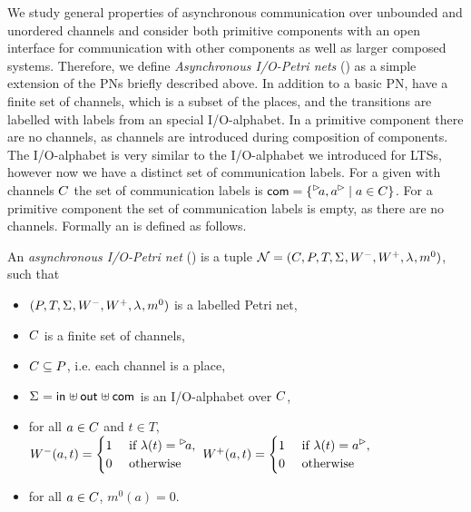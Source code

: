 We study general properties of asynchronous communication over unbounded and unordered channels and consider both primitive components with an open interface for communication with other components as well as larger composed systems. Therefore, we define \emph{Asynchronous I/O-Petri nets} (\AIOPNs) as a simple extension of the PNs briefly described above. In addition to a basic PN, \AIOPNs have a finite set of channels, which is a subset of the places, and the transitions are labelled with labels from an special I/O-alphabet. In a primitive component there are no channels, as channels are introduced during composition of components. The I/O-alphabet is very similar to the I/O-alphabet we introduced for LTSs, however now we have a distinct set of communication labels. For a given \AIOPN with channels $C$ the set of communication labels is $\com = \{\inact{a},\outact{a} \mid a \in \chan\}$. For a primitive component the set of communication labels is empty, as there are no channels. Formally an \AIOPN is defined as follows.

\begin{definition}
An \emph{asynchronous I/O-Petri net} (\AIOPN) is a tuple $\mathcal{N} = (C_{},\allowbreak P_{},\allowbreak T_{},\allowbreak \Sigma_{},\allowbreak W_{}^-,\allowbreak W_{}^+,\allowbreak \lambda_{},\allowbreak m^0_{})$, such that 
\begin{itemize}
    \item $ (P_{}, \allowbreak T_{}, \allowbreak \Sigma_{}, \allowbreak W_{}^-, \allowbreak W_{}^+, \allowbreak \lambda_{}, \allowbreak m^0_{})$ is a labelled Petri net,  
    \item $C$ is a finite set of channels, 
    \item $C \subseteq P$, i.e. each channel is a place, 
    \item $\Sigma_{} = \mathsf{in}_{} \uplus \mathsf{out}_{} \uplus \mathsf{com}_{}$ is an I/O-alphabet over $C$, 
    \item for all $a \in C$ and $t \in T$,\\
            $W^-(a,t) = \begin{cases}
                    1 &\text{ if } \lambda(t) = \inact{a},\\
                    0 &\text{ otherwise }
                \end{cases}$\qquad
            $W^+(a,t) = \begin{cases}
                    1 &\text{ if } \lambda(t) = \outact{a},\\
                    0 & \text{ otherwise}
                \end{cases}$
    \item for all $a \in C$, $m^0(a) = 0$.
    \end{itemize}
\end{definition}



